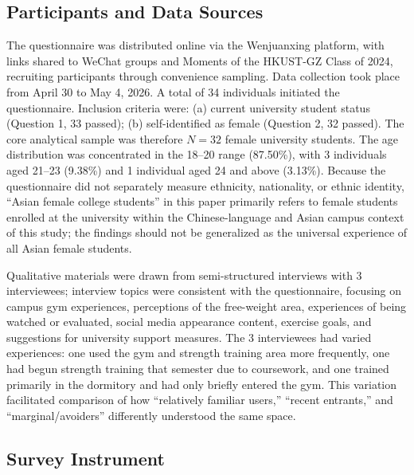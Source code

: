 \subsection{Participants and Data Sources}

The questionnaire was distributed online via the Wenjuanxing platform, with links shared to WeChat groups and Moments of the HKUST-GZ Class of 2024, recruiting participants through convenience sampling.
Data collection took place from April 30 to May 4, 2026.
A total of 34 individuals initiated the questionnaire.
Inclusion criteria were: (a) current university student status (Question 1, 33 passed); (b) self-identified as female (Question 2, 32 passed).
The core analytical sample was therefore $N = 32$ female university students.
The age distribution was concentrated in the 18--20 range (87.50\%), with 3 individuals aged 21--23 (9.38\%) and 1 individual aged 24 and above (3.13\%).
Because the questionnaire did not separately measure ethnicity, nationality, or ethnic identity, ``Asian female college students'' in this paper primarily refers to female students enrolled at the university within the Chinese-language and Asian campus context of this study; the findings should not be generalized as the universal experience of all Asian female students.

Qualitative materials were drawn from semi-structured interviews with 3 interviewees; interview topics were consistent with the questionnaire, focusing on campus gym experiences, perceptions of the free-weight area, experiences of being watched or evaluated, social media appearance content, exercise goals, and suggestions for university support measures.
The 3 interviewees had varied experiences: one used the gym and strength training area more frequently, one had begun strength training that semester due to coursework, and one trained primarily in the dormitory and had only briefly entered the gym.
This variation facilitated comparison of how ``relatively familiar users,'' ``recent entrants,'' and ``marginal/avoiders'' differently understood the same space.

\subsection{Survey Instrument}

